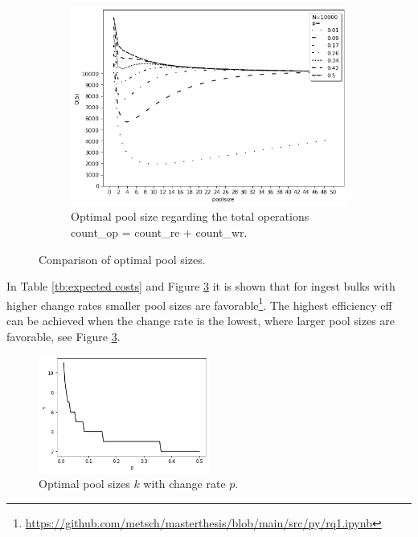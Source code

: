 \begin{figure}[t]
\begin{subfigure}{6cm}
        \includegraphics[width=\linewidth]{graphics/expected_operations.png}
        \caption{Optimal pool size regarding the total operations \acrshort{count_op} = \acrshort{count_re} + \acrshort{count_wr}.}\label{fig:expected_operations}
    \end{subfigure}
    \caption{Comparison of optimal pool sizes.}
\end{figure}
In Table \ref{tb:expected costs} and Figure \ref{fig:poolsizes} it is shown that for ingest bulks with higher change rates smaller pool sizes are favorable\footnote{\url{https://github.com/metsch/masterthesis/blob/main/src/py/rq1.ipynb}}.
The highest efficiency \acrshort{eff} can be achieved when the change rate is the lowest, where larger pool sizes are favorable, see Figure \ref{fig:poolsizes}.
\begin{figure}[t]%
    \centering
    \includegraphics[width=0.5\textwidth]{graphics/poolsizes.png}
    \caption{Optimal pool sizes $k$ with change rate $p$.}
    \label{fig:poolsizes}
\end{figure}
